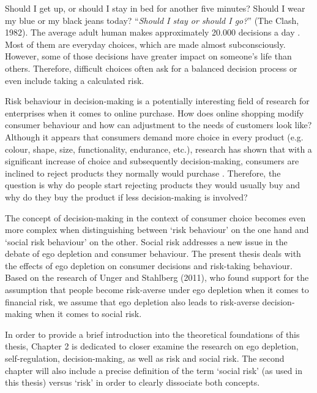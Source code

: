 \onehalfspacing
Should I get up, or should I stay in bed for another five minutes? Should I wear my blue or my black jeans today? “\emph{Should I stay or should I go?}” (The Clash, 1982). The average adult human makes approximately 20.000 decisions a day \citep{toennemann2008}. Most of them are everyday choices, which are made almost subconsciously. However, some of those decisions have greater impact on someone’s life than others. Therefore, difficult choices often ask for a balanced decision process or even include taking a calculated risk.\par
Risk behaviour in decision-making is a potentially interesting field of research for enterprises \citep{baumeister2002yielding} when it comes to online purchase. How does online shopping modify consumer behaviour and how can adjustment to the needs of customers look like? Although it appears that consumers demand more choice in every product (e.g. colour, shape, size, functionality, endurance, etc.), research has shown that with a significant increase of choice and subsequently decision-making, consumers are inclined to reject products they normally would purchase \citep{greifeneder2010less,levav2010order}. Therefore, the question is why do people start rejecting products they would usually buy and why do they buy the product if less decision-making is involved?\par
The concept of decision-making in the context of consumer choice becomes even more complex when distinguishing between ‘risk behaviour’ on the one hand and ‘social risk behaviour’ on the other. Social risk addresses a new issue in the debate of ego depletion and consumer behaviour. The present thesis deals with the effects of ego depletion on consumer decisions and risk-taking behaviour. Based on the research of Unger and Stahlberg (2011), who found support for the assumption that people become risk-averse under ego depletion when it comes to financial risk, we assume that ego depletion also leads to risk-averse decision-making when it comes to social risk.\par
In order to provide a brief introduction into the theoretical foundations of this thesis, Chapter 2 is dedicated to closer examine the research on ego depletion, self-regulation, decision-making, as well as risk and social risk. The second chapter will also include a precise definition of the term ‘social risk’ (as used in this thesis) versus ‘risk’ in order to clearly dissociate both concepts. \par
